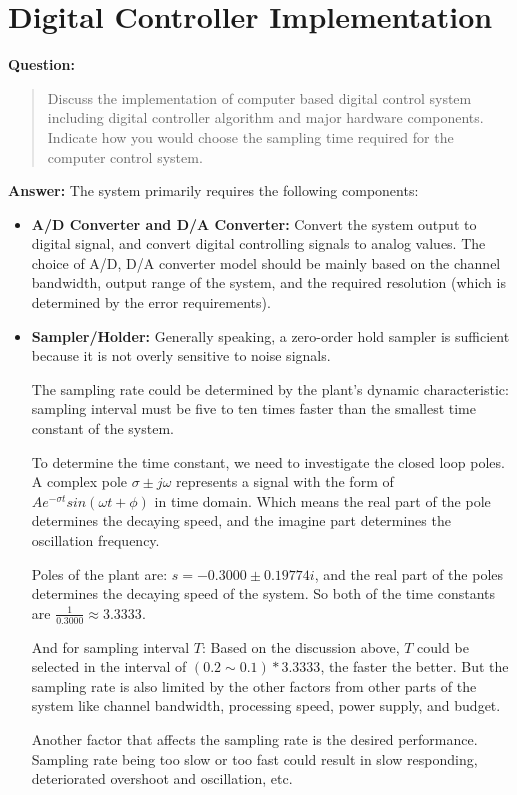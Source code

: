 \documentclass[12pt, oneside]{article}
\begin{document}
\section{Digital Controller Implementation}
\textbf{Question:}
\begin{quote}
    Discuss the implementation of computer based digital control system including digital controller algorithm and major hardware components. Indicate how you would choose the sampling time required for the computer control system.
\end{quote}
\textbf{Answer:}
The system primarily requires the following components:
\begin{itemize}
    \item \textbf{A/D Converter and D/A Converter:} Convert the system output to digital signal, and convert digital controlling signals to analog values. The choice of A/D, D/A converter model should be mainly based on the channel bandwidth, output range of the system, and the required resolution (which is determined by the error requirements).
    \item \textbf{Sampler/Holder:} Generally speaking, a zero-order hold sampler is sufficient because it is not overly sensitive to noise signals. 
    
    The sampling rate could be determined by the plant's dynamic characteristic: sampling interval must be five to ten times faster than the smallest time constant of the system.\cite{CourseMaterial}

    To determine the time constant, we need to investigate the closed loop poles. A complex pole $\sigma\pm j\omega$ represents a signal with the form of $Ae^{-\sigma t}sin(\omega t+\phi)$ in time domain. Which means the real part of the pole determines the decaying speed, and the imagine part determines the oscillation frequency.
    
    Poles of the plant are: $s=-0.3000\pm0.19774i$, and the real part of the poles determines the decaying speed of the system. So both of the time constants are $\frac{1}{0.3000}\approx3.3333$.

    And for sampling interval $T$: Based on the discussion above, $T$ could be selected in the interval of $(0.2\sim0.1)*3.3333$, the faster the better. But the sampling rate is also limited by the other factors from other parts of the system like channel bandwidth, processing speed, power supply, and budget.

    Another factor that affects the sampling rate is the desired performance.  Sampling rate being too slow or too fast could result in slow responding, deteriorated overshoot and oscillation, etc. 
    

\end{itemize}
\end{document}
